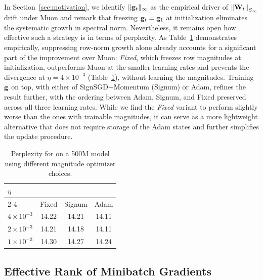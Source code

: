 In Section~\ref{sec:motivation}, we identify $\|\mathbf{g}_t\|_\infty$ as the empirical driver of $\left \| \mathbf{W}_t \right\|_{S_\infty}$ drift under Muon and remark that freezing $\mathbf{g}_t = \mathbf{g}_1$ at initialization eliminates the systematic growth in spectral norm. Nevertheless, it remains open how effective such a strategy is in terms of perplexity. As Table~\ref{tab:magnitude-optimizer} demonstrates empirically, suppressing row-norm growth alone already accounts for a significant part of the improvement over Muon: \emph{Fixed}, which freezes row magnitudes at initialization, outperforms Muon at the smaller learning rates and prevents the divergence at $\eta = 4 \times 10^{-3}$ (Table~\ref{tab:magnitude-optimizer}), without learning the magnitudes. Training $\mathbf{g}$ on top, with either of SignSGD+Momentum (Signum) or Adam, refines the result further, with the ordering between Adam, Signum, and Fixed preserved across all three learning rates. While we find the \emph{Fixed} variant to perform slightly worse than the ones with trainable magnitudes, it can serve as a more lightweight alternative that does not require storage of the Adam states and further simplifies the update procedure.

\begin{table}%
        \vspace{-10pt}
        \centering
        \setlength{\tabcolsep}{4pt}
        \caption{Perplexity for \algname{} on a 500M model using different magnitude optimizer choices.}
        \label{tab:magnitude-optimizer}
        \begin{tabular}{l ccc}
            \toprule
            $\eta$ & \multicolumn{3}{c}{\algname{}} \\
            \cmidrule(lr){2-4}
             &  Fixed & Signum & Adam \\
            \midrule
            $4 \times 10^{-3}$ & 14.22 & 14.21 & 14.11 \\
            $2 \times 10^{-3}$ & 14.21 & 14.18 & 14.11 \\
            $1 \times 10^{-3}$ & 14.30 & 14.27 & 14.24 \\
            \bottomrule
        \end{tabular}%
\end{table}



\subsection{Effective Rank of Minibatch Gradients}
\label{appdx:effective-rank}

